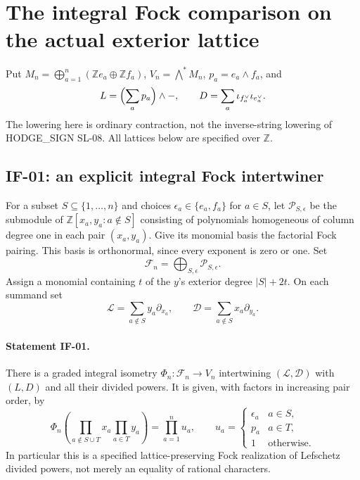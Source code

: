 \section{The integral Fock comparison on the actual exterior lattice}
\label{sec:integral-fock}

Put $M_n=\bigoplus_{a=1}^n(\mathbb Z e_a\oplus\mathbb Z f_a)$,
$V_n=\bigwedge^*M_n$, $p_a=e_a\wedge f_a$, and
\[
 L=\Bigl(\sum_a p_a\Bigr)\wedge-,\qquad
 D=\sum_a\iota_{f_a^\vee}\iota_{e_a^\vee}.
\]
The lowering here is ordinary contraction, not the inverse-string lowering
of HODGE\_SIGN SL-08. All lattices below are specified over $\mathbb Z$.

\subsection{IF-01: an explicit integral Fock intertwiner}
For a subset $S\subseteq\{1,\ldots,n\}$ and choices
$\epsilon_a\in\{e_a,f_a\}$ for $a\in S$, let
$\mathcal P_{S,\epsilon}$ be the submodule of
$\mathbb Z[x_a,y_a:a\notin S]$ consisting of polynomials homogeneous of
column degree one in each pair $(x_a,y_a)$. Give its monomial basis the
factorial Fock pairing. This basis is orthonormal, since every exponent is
zero or one. Set
\[
 \mathcal F_n=\bigoplus_{S,\epsilon}\mathcal P_{S,\epsilon}.
\]
Assign a monomial containing $t$ of the $y$'s exterior degree $|S|+2t$.
On each summand set
\[
 \mathscr L=\sum_{a\notin S}y_a\partial_{x_a},\qquad
 \mathscr D=\sum_{a\notin S}x_a\partial_{y_a}.
\]

\paragraph{Statement IF-01.}
There is a graded integral isometry $\Phi_n:\mathcal F_n\longrightarrow V_n$
intertwining $(\mathscr L,\mathscr D)$ with $(L,D)$ and all their divided
powers. It is given, with factors in increasing pair order, by
\[
 \Phi_n\left(\prod_{a\notin S\cup T}x_a\prod_{a\in T}y_a\right)
 =\prod_{a=1}^n u_a,\qquad
 u_a=\begin{cases}\epsilon_a&a\in S,\\p_a&a\in T,\\1&\text{otherwise}.
 \end{cases}
\]
In particular this is a specified lattice-preserving Fock realization of
Lefschetz divided powers, not merely an equality of rational characters.

